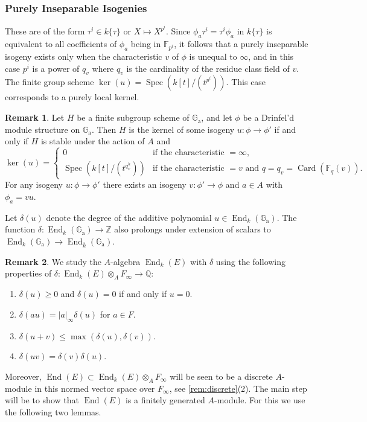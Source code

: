 \documentclass[12pt,a4paper]{article}
\theoremstyle{plain}
\theoremstyle{definition}
\newtheorem{remark}{Remark}[section]
\theoremstyle{remark}
\DeclareMathOperator{\End}{End}
\DeclareMathOperator{\Spec}{Spec}
\DeclareMathOperator{\Card}{Card}
\newcommand{\bF}{\mathbb{F}}
\newcommand{\bQ}{\mathbb{Q}}
\newcommand{\bZ}{\mathbb{Z}}
\newcommand{\Ga}{\mathbb{G}_\mathrm{a}}
\providecommand{\Ga}{\mathbb{G}_{\mathrm a}}
\providecommand{\End}{\operatorname{End}}
\providecommand{\Spec}{\operatorname{Spec}}
\begin{document}
\subsubsection*{Purely Inseparable Isogenies}

These are of the form $\tau^i \in k\{\tau\}$ or $X \mapsto X^{p^i}$. Since $\phi_a \tau^i = \tau^i \phi_a$ in $k\{\tau\}$ is equivalent to all coefficients of $\phi_a$ being in $\bF_{p^i}$, it follows that a purely inseparable isogeny exists only when the characteristic $v$ of $\phi$ is unequal to $\infty$, and in this case $p^i$ is a power of $q_v$ where $q_v$ is the cardinality of the residue class field of $v$. The finite group scheme $\ker(u) = \Spec(k[t]/(t^{p^i}))$. This case corresponds to a purely local kernel.

\begin{remark}
\label{rem:kernel}
Let $H$ be a finite subgroup scheme of $\Ga$, and let $\phi$ be a Drinfel'd module structure on $\Ga$. Then $H$ is the kernel of some isogeny $u: \phi \to \phi'$ if and only if $H$ is stable under the action of $A$ and
\[
\ker(u) = \begin{cases} 0 & \text{if the characteristic } = \infty, \\ \Spec(k[t]/(t^{q_v^h})) & \text{if the characteristic } = v \text{ and } q = q_v = \Card(\bF_q(v)). \end{cases}
\]
For any isogeny $u: \phi \to \phi'$ there exists an isogeny $v: \phi' \to \phi$ and $a \in A$ with $\phi_a = vu$.
\end{remark}

Let $\delta(u)$ denote the degree of the additive polynomial $u \in \End_k(\Ga)$. The function $\delta: \End_k(\Ga) \to \bZ$ also prolongs under extension of scalars to $\End_k(\Ga) \to \End_{\overline{k}}(\Ga)$.

\begin{remark}
\label{rem:End}
We study the $A$-algebra $\End_k(E)$ with $\delta$ using the following properties of $\delta: \End_k(E) \otimes_A F_\infty \to \bQ$:
\begin{enumerate}[label=(\arabic*)]
\item $\delta(u) \geq 0$ and $\delta(u) = 0$ if and only if $u = 0$.
\item $\delta(au) = |a|_\infty \delta(u)$ for $a \in F$.
\item $\delta(u+v) \leq \max(\delta(u), \delta(v))$.
\item $\delta(uv) = \delta(v)\delta(u)$.
\end{enumerate}
Moreover, $\End(E) \subset \End_k(E) \otimes_A F_\infty$ will be seen to be a discrete $A$-module in this normed vector space over $F_\infty$, see \eqref{rem:discrete}(2). The main step will be to show that $\End(E)$ is a finitely generated $A$-module. For this we use the following two lemmas.
\end{remark}
\end{document}
